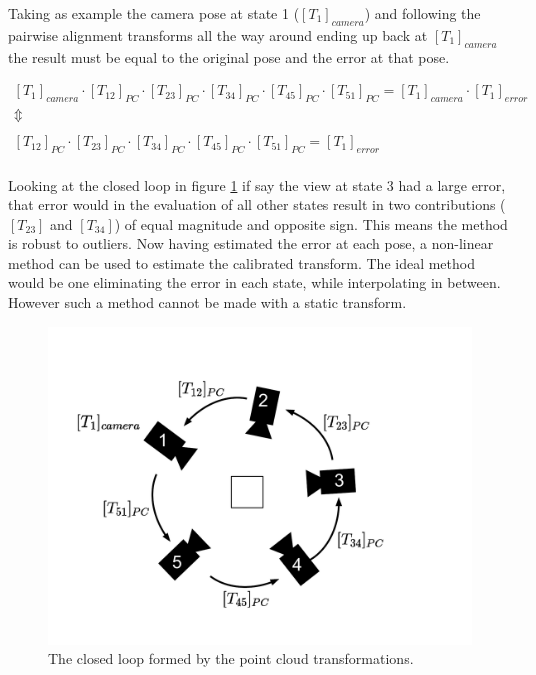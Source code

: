 \noindent Taking as example the camera pose at state 1 ($ [T_1]_{camera} $) and following the pairwise alignment transforms all the way around ending up back at $ [T_1]_{camera} $ the result must be equal to the original pose and the error at that pose.

\begin{equation}
\begin{matrix}
[T_{1}]_{camera} \cdot [T_{12}]_{PC} \cdot [T_{23}]_{PC} \cdot [T_{34}]_{PC} \cdot [T_{45}]_{PC} \cdot [T_{51}]_{PC} = [T_{1}]_{camera} \cdot [T_{1}]_{error}
\\ 
\Updownarrow \\ 
\\ 
[T_{12}]_{PC} \cdot [T_{23}]_{PC} \cdot [T_{34}]_{PC} \cdot [T_{45}]_{PC} \cdot [T_{51}]_{PC} = [T_{1}]_{error}
\end{matrix}
\end{equation}\\ 

\noindent Looking at the closed loop in figure \ref{fig:new_calibration} if say the view at state 3 had a large error, that error would in the evaluation of all other states result in two contributions ($ [T_{23}] $ and $ [T_{34}] $) of equal magnitude and opposite sign. This means the method is robust to outliers. Now having estimated the error at each pose, a non-linear method can be used to estimate the calibrated transform. The ideal method would be one eliminating the error in each state, while interpolating in between. However such a method cannot be made with a static transform.


\begin{figure}[htb]
	\begin{center}
		\includegraphics[width=\textwidth,trim=0 0 0 0]{graphics/03_calibration/new_calibration.pdf}%
		\caption{The closed loop formed by the point cloud transformations.}\label{fig:new_calibration}
	\end{center}
\end{figure}


